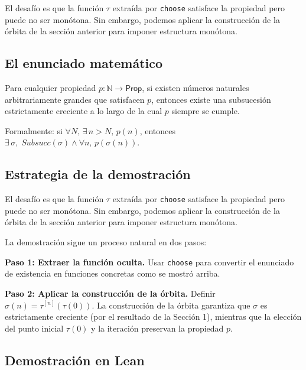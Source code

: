 El desafío es que la función $\tau$ extraída por \texttt{choose} satisface
la propiedad pero puede no ser monótona. Sin embargo, podemos aplicar la
construcción de la órbita de la sección anterior para imponer estructura
monótona.

\subsection{El enunciado matemático}

\begin{theorem}
Para cualquier propiedad $p : \mathbb{N} \to \mathsf{Prop}$, si existen
números naturales arbitrariamente grandes que satisfacen $p$, entonces
existe una subsucesión estrictamente creciente a lo largo de la cual $p$
siempre se cumple.

Formalmente: si $\forall N,\, \exists\, n > N,\, p(n)$, entonces
$\exists\, \sigma,\; \mathit{Subsucc}(\sigma) \land \forall n,\, p(\sigma(n))$.
\end{theorem}

\subsection{Estrategia de la demostración}

El desafío es que la función $\tau$ extraída por \texttt{choose} satisface
la propiedad pero puede no ser monótona. Sin embargo, podemos aplicar la
construcción de la órbita de la sección anterior para imponer estructura
monótona.

La demostración sigue un proceso natural en dos pasos:

\textbf{Paso 1: Extraer la función oculta.} Usar \texttt{choose} para
convertir el enunciado de existencia en funciones concretas como se mostró
arriba.

\textbf{Paso 2: Aplicar la construcción de la órbita.} Definir
$\sigma(n) = \tau^{[n]}(\tau(0))$. La construcción de la órbita garantiza
que $\sigma$ es estrictamente creciente (por el resultado de la Sección
1), mientras que la elección del punto inicial $\tau(0)$ y la iteración
preservan la propiedad $p$.

\subsection{Demostración en Lean}

